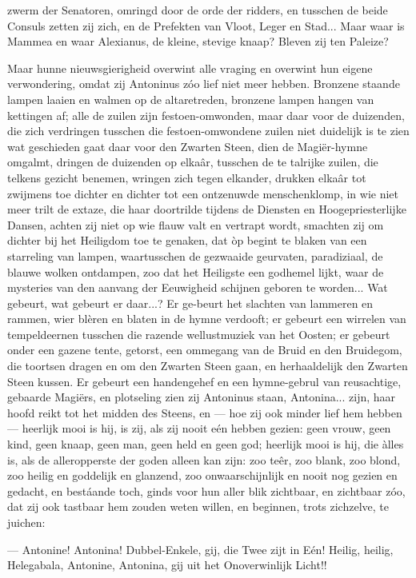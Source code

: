 \documentclass[a4paper, 12pt, oneside, dutch]{article}
\begin{document}
zwerm der Senatoren, omringd door de orde der ridders, en tusschen de beide Consuls zetten zij zich, en de Prefekten van Vloot, Leger en Stad... Maar waar is Mammea en waar Alexianus, de kleine, stevige knaap? Bleven zij ten Paleize?

Maar hunne nieuwsgierigheid overwint alle vraging en overwint hun eigene verwondering, omdat zij Antoninus zóo lief niet meer hebben. Bronzene staande lampen laaien en walmen op de altaretreden, bronzene lampen hangen van kettingen af; alle de zuilen zijn festoen-omwonden, maar daar voor de duizenden, die zich verdringen tusschen die festoen-omwondene zuilen niet duidelijk is te zien wat geschieden gaat daar voor den Zwarten Steen, dien de Magiër-hymne omgalmt, dringen de duizenden op elkaâr, tusschen de te talrijke zuilen, die telkens gezicht benemen, wringen zich tegen elkander, drukken elkaâr tot zwijmens toe dichter en dichter tot een ontzenuwde menschenklomp, in wie niet meer trilt de extaze, die haar doortrilde tijdens de Diensten en Hoogepriesterlijke Dansen, achten zij niet op wie flauw valt en vertrapt wordt, smachten zij om dichter bij het Heiligdom toe te genaken, dat òp begint te blaken van een starreling van lampen, waartusschen de gezwaaide geurvaten, paradiziaal, de blauwe wolken ontdampen, zoo dat het Heiligste een godhemel lijkt, waar de mysteries van den aanvang der Eeuwigheid schijnen geboren te worden... Wat gebeurt, wat gebeurt er daar...? Er ge-beurt het slachten van lammeren en rammen, wier blèren en blaten in de hymne verdooft; er gebeurt een wirrelen van tempeldeernen tusschen die razende wellustmuziek van het Oosten; er gebeurt onder een gazene tente, getorst, een ommegang van de Bruid en den Bruidegom, die toortsen dragen en om den Zwarten Steen gaan, en herhaaldelijk den Zwarten Steen kussen. Er gebeurt een handengehef en een hymne-gebrul van reusachtige, gebaarde Magiërs, en plotseling zien zij Antoninus staan, Antonina... zijn, haar hoofd reikt tot het midden des Steens, en --- hoe zij ook minder lief hem hebben --- heerlijk mooi is hij, is zij, als zij nooit eén hebben gezien: geen vrouw, geen kind, geen knaap, geen man, geen held en geen god; heerlijk mooi is hij, die àlles is, als de alleropperste der goden alleen kan zijn: zoo teêr, zoo blank, zoo blond, zoo heilig en goddelijk en glanzend, zoo onwaarschijnlijk en nooit nog gezien en gedacht, en bestáande toch, ginds voor hun aller blik zichtbaar, en zichtbaar zóo, dat zij ook tastbaar hem zouden weten willen, en beginnen, trots zichzelve, te juichen:

--- Antonine! Antonina! Dubbel-Enkele, gij, die Twee zijt in Eén! Heilig, heilig, Helegabala, Antonine, Antonina, gij uit het Onoverwinlijk Licht!!
\end{document}
